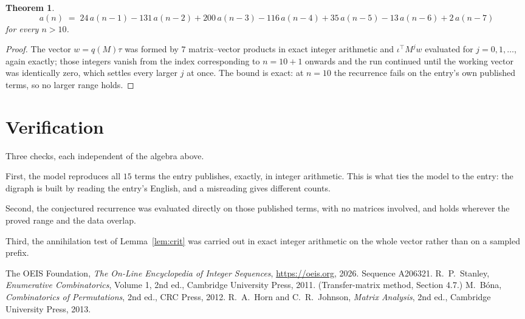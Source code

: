\documentclass[11pt,a4paper]{article}
\theoremstyle{plain}
\newtheorem{theorem}{Theorem}
\theoremstyle{definition}
\begin{document}
\begin{theorem}
\[
a(n)\;=\;24\,a(n-1) - 131\,a(n-2) + 200\,a(n-3) - 116\,a(n-4) + 35\,a(n-5) - 13\,a(n-6) + 2\,a(n-7)
\]
for every $n>10$.
\end{theorem}

\begin{proof}
The vector $w=q(M)\tau$ was formed by $7$ matrix--vector products in exact integer
arithmetic and $\iota^{\!\top}M^{j}w$ evaluated for $j=0,1,\dots$, again exactly; those
integers vanish from the index corresponding to $n=10+1$ onwards and the run continued
until the working vector was identically zero, which settles every larger $j$ at once. The bound is exact: at $n=10$ the recurrence fails on the entry's own published terms, so no larger range holds.
\end{proof}

\section{Verification}

Three checks, each independent of the algebra above.

First, the model reproduces all $15$ terms the entry publishes, exactly, in integer
arithmetic. This is what ties the model to the entry: the digraph is built by reading the
entry's English, and a misreading gives different counts.

Second, the conjectured recurrence was evaluated directly on those published terms, with no
matrices involved, and holds wherever the proved range and the data overlap.

Third, the annihilation test of Lemma~\ref{lem:crit} was carried out in exact integer
arithmetic on the whole vector rather than on a sampled prefix.

\begin{thebibliography}{9}
 The OEIS Foundation, \emph{The On-Line Encyclopedia of Integer
Sequences}, \url{https://oeis.org}, 2026. Sequence A206321.
 R.~P.~Stanley, \emph{Enumerative Combinatorics}, Volume 1, 2nd ed.,
Cambridge University Press, 2011. (Transfer-matrix method, Section 4.7.)
 M.~B\'ona, \emph{Combinatorics of Permutations}, 2nd ed., CRC
Press, 2012.
 R.~A.~Horn and C.~R.~Johnson, \emph{Matrix Analysis}, 2nd ed., Cambridge
University Press, 2013.
\end{thebibliography}
\end{document}
